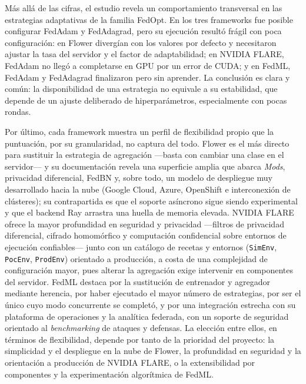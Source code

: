 Más allá de las cifras, el estudio revela un comportamiento transversal en las
estrategias adaptativas de la familia FedOpt. En los tres frameworks fue posible
configurar FedAdam y FedAdagrad, pero su ejecución resultó frágil con poca
configuración: en Flower divergían con los valores por defecto y necesitaron ajustar
la tasa del servidor y el factor de adaptabilidad; en NVIDIA FLARE, FedAdam no llegó a
completarse en GPU por un error de CUDA; y en FedML, FedAdam y FedAdagrad finalizaron
pero sin aprender. La conclusión es clara y común: la disponibilidad de una estrategia
no equivale a su estabilidad, que depende de un ajuste deliberado de hiperparámetros,
especialmente con pocas rondas.

Por último, cada framework muestra un perfil de flexibilidad propio que la puntuación,
por su granularidad, no captura del todo. Flower es el más directo para sustituir la
estrategia de agregación —basta con cambiar una clase en el servidor— y su documentación
revela una superficie amplia que abarca \textit{Mods}, privacidad diferencial, FedBN y,
sobre todo, un modelo de despliegue muy desarrollado hacia la nube (Google Cloud, Azure,
OpenShift e interconexión de clústeres); su contrapartida es que el soporte asíncrono
sigue siendo experimental y que el backend Ray arrastra una huella de memoria elevada.
NVIDIA FLARE ofrece la mayor profundidad en seguridad y privacidad —filtros de privacidad
diferencial, cifrado homomórfico y computación confidencial sobre entornos de ejecución
confiables— junto con un catálogo de recetas y entornos (\texttt{SimEnv}, \texttt{PocEnv},
\texttt{ProdEnv}) orientado a producción, a costa de una complejidad de configuración
mayor, pues alterar la agregación exige intervenir en componentes del servidor. FedML
destaca por la sustitución de entrenador y agregador mediante herencia, por haber
ejecutado el mayor número de estrategias, por ser el único cuyo modo concurrente se
completó, y por una integración estrecha con su plataforma de operaciones y la analítica
federada, con un soporte de seguridad orientado al \textit{benchmarking} de ataques y
defensas. La elección entre ellos, en términos de flexibilidad, depende por tanto de la
prioridad del proyecto: la simplicidad y el despliegue en la nube de Flower, la
profundidad en seguridad y la orientación a producción de NVIDIA FLARE, o la
extensibilidad por componentes y la experimentación algorítmica de FedML.
